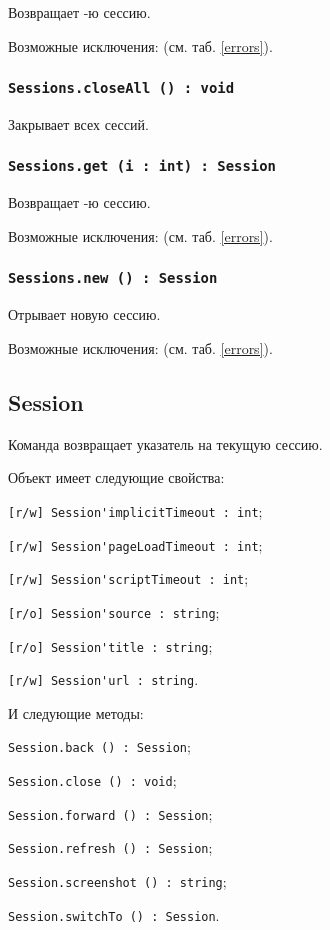 Возвращает -ю сессию.

Возможные исключения:  (см. таб. \ref{errors}).

\subsubsection{\lstinline|Sessions.closeAll () : void|}

Закрывает всех сессий.

\subsubsection{\lstinline|Sessions.get (i : int) : Session|}

Возвращает -ю сессию.

Возможные исключения:  (см. таб. \ref{errors}).

\subsubsection{\lstinline|Sessions.new () : Session|}

Отрывает новую сессию.

Возможные исключения:  (см. таб. \ref{errors}).

\subsection{{\color{orange} Session}}

Команда \session{} возвращает указатель на текущую сессию.

Объект \session{} имеет следующие свойства:
\begin{icItems}
	\item \lstinline|[r/w] Session'implicitTimeout : int|;
	\item \lstinline|[r/w] Session'pageLoadTimeout : int|;
	\item \lstinline|[r/w] Session'scriptTimeout : int|;
	\item \lstinline|[r/o] Session'source : string|;
	\item \lstinline|[r/o] Session'title : string|;
	\item \lstinline|[r/w] Session'url : string|.
\end{icItems}

И следующие методы:
\begin{icItems}
	\item \lstinline|Session.back () : Session|;
	\item \lstinline|Session.close () : void|;
	\item \lstinline|Session.forward () : Session|;
	\item \lstinline|Session.refresh () : Session|;
	\item \lstinline|Session.screenshot () : string|;
	\item \lstinline|Session.switchTo () : Session|.
\end{icItems}

